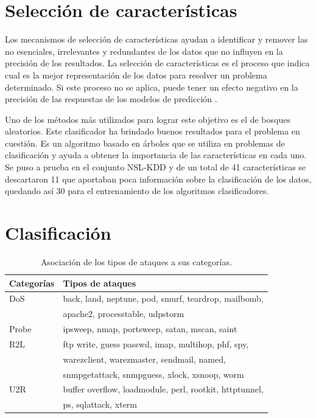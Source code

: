 \section{Selección de características}
Los mecanismos de selección de características ayudan a identificar y remover las no esenciales, irrelevantes y redundantes de los datos que no influyen en la precisión de los resultados. La selección de características es el proceso que indica cual es la mejor representación de los datos para resolver un problema determinado. Si este proceso no se aplica, puede tener un efecto negativo en la precisión de las respuestas de los modelos de predicción \cite{tuv2009feature}.

Uno de los métodos más utilizados para lograr este objetivo es el de bosques aleatorios. Este clasificador ha brindado buenos resultados para el problema en cuestión. Es un algoritmo basado en árboles que se utiliza en problemas de clasificación y ayuda a obtener la importancia de las características en cada uno. Se puso a prueba en el conjunto NSL-KDD y de un total de 41 características se descartaron 11 que aportaban poca información sobre la clasificación de los datos, quedando así 30 para el entrenamiento de los algoritmos clasificadores.

\section{Clasificación}
\begin{table}[b]
    \begin{center}
        \caption{Asociación de los tipos de ataques a sus categorías.}
        
        \label{tab:class}
        \begin{tabular}{l|l} %
        \textbf{Categorías} & \textbf{Tipos de ataques}\\
        \hline
        DoS & back, land, neptune, pod, smurf, teardrop, mailbomb,\\ 
        & apache2, processtable, udpstorm\\
        Probe & ipsweep, nmap, portsweep, satan, mscan, saint\\
        R2L & ftp write, guess passwd, imap, multihop, phf, spy,\\
        & warezclient, warezmaster, sendmail, named,\\
        & snmpgetattack, snmpguess, xlock, xsnoop, worm\\
        U2R & buffer overflow, loadmodule, perl, rootkit, httptunnel,\\
        & ps, sqlattack, xterm\\
        \end{tabular}
    \end{center}
\end{table}

